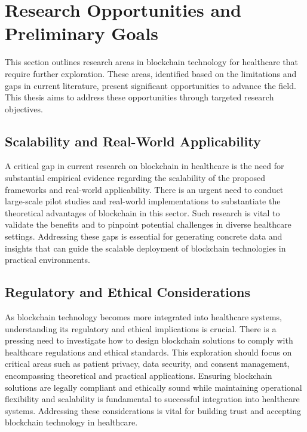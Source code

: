 \documentclass[cic,tc,english]{iiufrgs}
\begin{document}
    \section{Research Opportunities and Preliminary Goals}

        This section outlines research areas in blockchain technology for healthcare that require further exploration. These areas, identified based on the limitations and gaps in current literature, present significant opportunities to advance the field. This thesis aims to address these opportunities through targeted research objectives.

        \subsection{Scalability and Real-World Applicability} 
            A critical gap in current research on blockchain in healthcare is the need for substantial empirical evidence regarding the scalability of the proposed frameworks and real-world applicability. There is an urgent need to conduct large-scale pilot studies and real-world implementations to substantiate the theoretical advantages of blockchain in this sector. Such research is vital to validate the benefits and to pinpoint potential challenges in diverse healthcare settings. Addressing these gaps is essential for generating concrete data and insights that can guide the scalable deployment of blockchain technologies in practical environments.

        \subsection{Regulatory and Ethical Considerations} 
            As blockchain technology becomes more integrated into healthcare systems, understanding its regulatory and ethical implications is crucial. There is a pressing need to investigate how to design blockchain solutions to comply with healthcare regulations and ethical standards. This exploration should focus on critical areas such as patient privacy, data security, and consent management, encompassing theoretical and practical applications. Ensuring blockchain solutions are legally compliant and ethically sound while maintaining operational flexibility and scalability is fundamental to successful integration into healthcare systems. Addressing these considerations is vital for building trust and accepting blockchain technology in healthcare.
\end{document}
